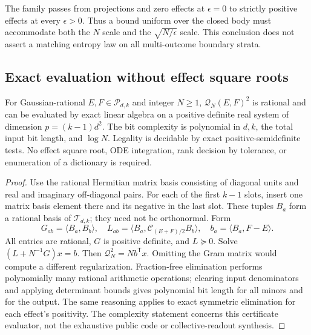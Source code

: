 The family passes from projections and zero effects at $\epsilon=0$
to strictly positive effects at every $\epsilon>0$.  Thus a bound
uniform over the closed body must accommodate both the $N$ scale
and the $\sqrt{N/\epsilon}$ scale.  This conclusion does not assert a
matching entropy law on all multi-outcome boundary strata.

\subsection{Exact evaluation without effect square roots}

\begin{proposition}
\label{prop:covarianceexact83}
For Gaussian-rational $E,F\in\mathcal P_{d,k}$ and integer $N\ge1$,
$\mathcal Q_N(E,F)^2$ is rational and can be evaluated by exact
linear algebra on a positive definite real system of dimension
$p=(k-1)d^2$.  The bit complexity is polynomial in $d,k$, the total
input bit length, and $\log N$.  Legality is decidable by exact
positive-semidefinite tests.  No effect square root, ODE integration,
rank decision by tolerance, or enumeration of a dictionary is required.
\end{proposition}
\begin{proof}
Use the rational Hermitian matrix basis consisting of diagonal
units and real and imaginary off-diagonal pairs.  For each of the
first $k-1$ slots, insert one matrix basis element there and its
negative in the last slot.  These tuples $B_a$ form a rational basis
of $\mathcal T_{d,k}$; they need not be orthonormal.  Form
\[
 G_{ab}=\langle B_a,B_b\rangle,\quad
 L_{ab}=\langle B_a,\mathcal C_{(E+F)/2}B_b\rangle,\quad
 b_a=\langle B_a,F-E\rangle.
\]
All entries are rational, $G$ is positive definite, and $L\succeq0$.
Solve $(L+N^{-1}G)x=b$.  Then
$\mathcal Q_N^2=N b^{\mathsf T}x$.  Omitting the Gram matrix would
compute a different regularization.  Fraction-free elimination
performs polynomially many rational arithmetic operations; clearing
input denominators and applying determinant bounds gives polynomial
bit length for all minors and for the output.  The same reasoning
applies to exact symmetric elimination for each effect's positivity.
The complexity statement concerns this certificate evaluator, not
the exhaustive public code or collective-readout synthesis.
\end{proof}
